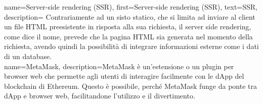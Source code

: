 {
    name={Server-side rendering (SSR)},
    first={Server-side rendering (SSR)},
    text={SSR},
    description={
            Contrariamente ad un sisto statico, che si limita ad inviare al client un file HTML preesistente in risposta alla sua richiesta,
            il server side rendering, come dice il nome, prevede che la pagina HTML sia generata nel momento della richiesta, avendo quindi la possibilità di integrare informazioni esterne come i dati di un database. \\
        }
}
{
    name={MetaMask},
    description={MetaMask è un'estensione o un plugin per browser web che permette agli utenti di interagire facilmente con le dApp del blockchain di Ethereum.
    Questo è possibile, perché MetaMask funge da ponte tra dApp e browser web, facilitandone l'utilizzo e il divertimento.}
}

